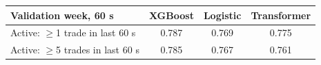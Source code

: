 \begin{tabular}{lccc}
\toprule
Validation week, 60 s & XGBoost & Logistic & Transformer \\
\midrule
Active: $\geq$1 trade in last 60 s & 0.787 & 0.769 & 0.775 \\
Active: $\geq$5 trades in last 60 s & 0.785 & 0.767 & 0.761 \\
\bottomrule
\end{tabular}
